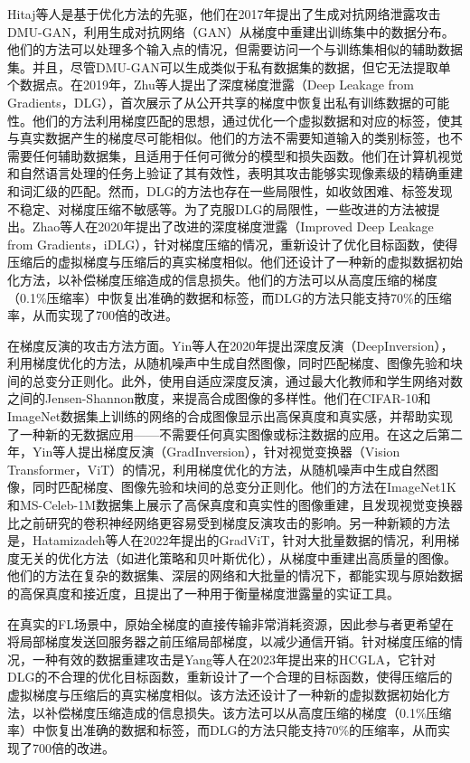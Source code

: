 Hitaj等人\cite{Deep_Models_Under_the_GAN}是基于优化方法的先驱，他们在2017年提出了生成对抗网络泄露攻击DMU-GAN，利用生成对抗网络（GAN）从梯度中重建出训练集中的数据分布。他们的方法可以处理多个输入点的情况，但需要访问一个与训练集相似的辅助数据集。并且，尽管DMU-GAN可以生成类似于私有数据集的数据，但它无法提取单个数据点。在2019年，Zhu等人\cite{DLG}提出了深度梯度泄露（Deep Leakage from Gradients，DLG），首次展示了从公开共享的梯度中恢复出私有训练数据的可能性。他们的方法利用梯度匹配的思想，通过优化一个虚拟数据和对应的标签，使其与真实数据产生的梯度尽可能相似。他们的方法不需要知道输入的类别标签，也不需要任何辅助数据集，且适用于任何可微分的模型和损失函数。他们在计算机视觉和自然语言处理的任务上验证了其有效性，表明其攻击能够实现像素级的精确重建和词汇级的匹配。然而，DLG的方法也存在一些局限性，如收敛困难、标签发现不稳定、对梯度压缩不敏感等。为了克服DLG的局限性，一些改进的方法被提出。Zhao等人\cite{iDLGID}在2020年提出了改进的深度梯度泄露（Improved Deep Leakage from Gradients，iDLG），针对梯度压缩的情况，重新设计了优化目标函数，使得压缩后的虚拟梯度与压缩后的真实梯度相似。他们还设计了一种新的虚拟数据初始化方法，以补偿梯度压缩造成的信息损失。他们的方法可以从高度压缩的梯度（0.1\%压缩率）中恢复出准确的数据和标签，而DLG的方法只能支持70\%的压缩率，从而实现了700倍的改进。

在梯度反演的攻击方法方面。Yin等人\cite{DeepInversion}在2020年提出深度反演（DeepInversion），利用梯度优化的方法，从随机噪声中生成自然图像，同时匹配梯度、图像先验和块间的总变分正则化。此外，使用自适应深度反演，通过最大化教师和学生网络对数之间的Jensen-Shannon散度，来提高合成图像的多样性。他们在CIFAR-10和ImageNet数据集上训练的网络的合成图像显示出高保真度和真实感，并帮助实现了一种新的无数据应用——不需要任何真实图像或标注数据的应用。在这之后第二年，Yin等人\cite{GradInversion}提出梯度反演（GradInversion），针对视觉变换器（Vision Transformer，ViT）的情况，利用梯度优化的方法，从随机噪声中生成自然图像，同时匹配梯度、图像先验和块间的总变分正则化。他们的方法在ImageNet1K和MS-Celeb-1M数据集上展示了高保真度和真实性的图像重建，且发现视觉变换器比之前研究的卷积神经网络更容易受到梯度反演攻击的影响。另一种新颖的方法是，Hatamizadeh等人\cite{GradViT}在2022年提出的GradViT，针对大批量数据的情况，利用梯度无关的优化方法（如进化策略和贝叶斯优化），从梯度中重建出高质量的图像。他们的方法在复杂的数据集、深层的网络和大批量的情况下，都能实现与原始数据的高保真度和接近度，且提出了一种用于衡量梯度泄露量的实证工具。

在真实的FL场景中，原始全梯度的直接传输非常消耗资源，因此参与者更希望在将局部梯度发送回服务器之前压缩局部梯度，以减少通信开销\cite{Gradient_Leakage_Attacks_in_Federated_Learning}。针对梯度压缩的情况，一种有效的数据重建攻击是Yang等人\cite{HCGLA}在2023年提出来的HCGLA，它针对DLG的不合理的优化目标函数，重新设计了一个合理的目标函数，使得压缩后的虚拟梯度与压缩后的真实梯度相似。该方法还设计了一种新的虚拟数据初始化方法，以补偿梯度压缩造成的信息损失。该方法可以从高度压缩的梯度（0.1\%压缩率）中恢复出准确的数据和标签，而DLG的方法只能支持70\%的压缩率，从而实现了700倍的改进。


